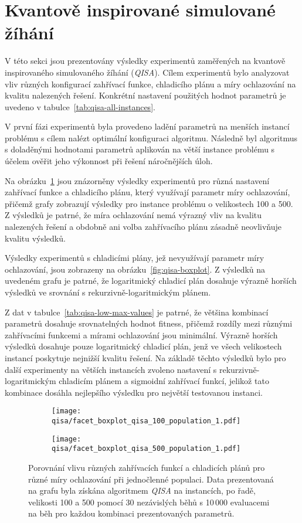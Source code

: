 \section{Kvantově inspirované simulované žíhání}\label{sec:exp-qisa}
V této sekci jsou prezentovány výsledky experimentů zaměřených na kvantově inspirovaného simulovaného žíhání (\emph{QISA}). 
Cílem experimentů bylo analyzovat vliv různých konfigurací zahřívací funkce, chladicího plánu a míry ochlazování na kvalitu nalezených řešení. 
Konkrétní nastavení použitých hodnot parametrů je uvedeno v tabulce~\ref{tab:qisa-all-instances}. 

V první fázi experimentů byla provedeno ladění parametrů na menších instancí problému s cílem nalézt optimální konfiguraci algoritmu. 
Následně byl algoritmus s doladěnými hodnotami parametrů aplikován na větší instance problému s účelem ověřit jeho výkonnost při řešení náročnějších úloh. 

Na obrázku~\ref{fig:qisa-fining} jsou znázorněny výsledky experimentů pro různá nastavení zahřívací funkce a chladicího plánu, který využívají parametr míry ochlazování, přičemž grafy zobrazují výsledky pro instance problému o velikostech 100 a 500. 
Z výsledků je patrné, že míra ochlazování nemá výrazný vliv na kvalitu nalezených řešení a obdobně ani volba zahřívacího plánu zásadně neovlivňuje kvalitu výsledků. 

Výsledky experimentů s chladicími plány, jež nevyužívají parametr míry ochlazování, jsou zobrazeny na obrázku~\ref{fig:qisa-boxplot}. 
Z výsledků na uvedeném grafu je patrné, že logaritmický chladicí plán dosahuje výrazně horších výsledků ve srovnání s rekurzivně-logaritmickým plánem.

Z dat v tabulce~\ref{tab:qisa-low-max-values} je patrné, že většina kombinací parametrů dosahuje srovnatelných hodnot fitness, přičemž rozdíly mezi různými zahřívacími funkcemi a mírami ochlazování jsou minimální. 
Výrazně horších výsledků dosahuje pouze logaritmický chladicí plán, jenž ve všech velikostech instancí poskytuje nejnižší kvalitu řešení. 
Na základě těchto výsledků bylo pro další experimenty na větších instancích zvoleno nastavení s rekurzivně-logaritmickým chladicím plánem a sigmoidní zahřívací funkcí, jelikož tato kombinace dosáhla nejlepšího výsledku pro největší testovanou instanci.

\begin{figure}[ht!]
    \centering
    \begin{subfigure}[b]{\linewidth}
        \texttt{[image: qisa/facet\_boxplot\_qisa\_100\_population\_1.pdf]}
    \end{subfigure}
    \begin{subfigure}[b]{\linewidth}
        \texttt{[image: qisa/facet\_boxplot\_qisa\_500\_population\_1.pdf]}
    \end{subfigure}
    \caption{Porovnání vlivu různých zahřívacích funkcí a chladicích plánů pro různé míry ochlazování při jednočlenné populaci. Data prezentovaná na grafu byla získána algoritmem \emph{QISA} na instancích, po řadě, velikosti 100 a 500 pomocí 30 nezávislých běhů s 10\,000 evaluacemi na běh pro každou kombinaci prezentovaných parametrů.}
    \label{fig:qisa-fining}
\end{figure}

